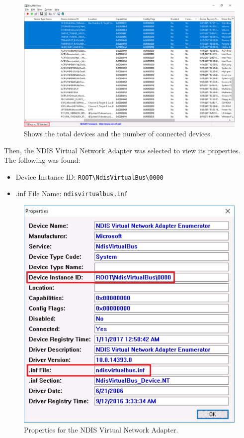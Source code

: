 \begin{figure}[H]
    \centering
    \includegraphics[width=\linewidth]{figures/pic18.png}
    \caption{Shows the total devices and the number of connected devices.}
\end{figure}
Then, the NDIS Virtual Network Adapter was selected to view its properties. The following was found:
\begin{itemize}
    \item Device Instance ID: \verb|ROOT\NdisVirtualBus\0000|
    \item .inf File Name: \verb|ndisvirtualbus.inf|
\end{itemize}

\begin{figure}[H]
    \centering
    \includegraphics[width=0.8\linewidth]{figures/pic19.png}
    \caption{Properties for the NDIS Virtual Network Adapter.}
\end{figure}

